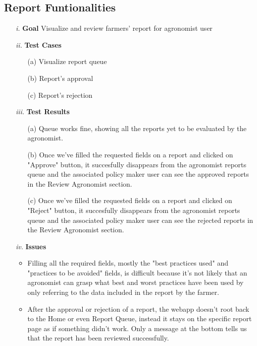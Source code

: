 \documentclass[table, 12pt]{article}
\begin{document}
\subsection{Report Funtionalities}
\begin{itemize}
    \item[\textit{i.}] \textbf{Goal} Visualize and review farmers' report for agronomist user
    \item[\textit{ii.}] \textbf{Test Cases}
    \begin{itemize}
        \item[(a)] Visualize report queue
        \item[(b)] Report's approval
        \item[(c)] Report's rejection 
    \end{itemize} 
    \item[\textit{iii.}] \textbf{Test Results}
    \begin{itemize}
        \item[(a)] Queue works fine, showing all the reports yet to be evaluated by the agronomist.
        \item[(b)] Once we've filled the requested fields on a report and clicked on "Approve" button, it succesfully disappears from the agronomist reports queue and the associated policy maker user can see the approved reports in the Review Agronomist section.
        \item[(c)] Once we've filled the requested fields on a report and clicked on "Reject" button, it succesfully disappears from the agronomist reports queue and the associated policy maker user can see the rejected reports in the Review Agronomist section.
    \end{itemize} 
    \item[\textit{iv.}] \textbf{Issues} 
    \begin{itemize}
        \item Filling all the required fields, mostly the "best practices used" and "practices to be avoided" fields, is difficult because it's not likely that an agronomist can grasp what best and worst practices have been used by only referring to the data included in the report by the farmer.
        \item After the approval or rejection of a report, the webapp doesn't root back to the Home or even Report Queue, instead it stays on the specific report page as if something didn't work. Only a message at the bottom tells us that the report has been reviewed successfully. 
    \end{itemize}   
\end{itemize}
\end{document}
